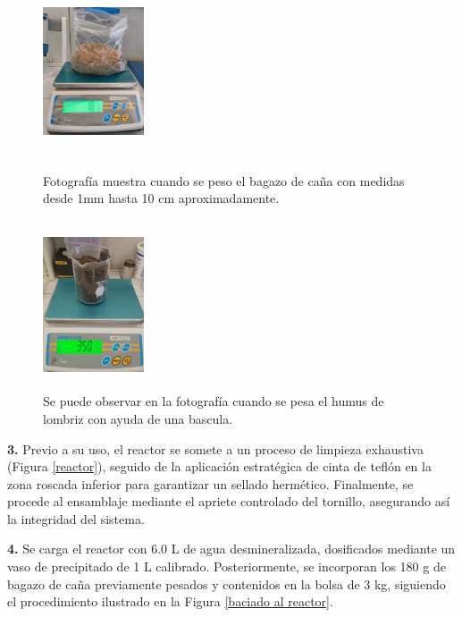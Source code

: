 \documentclass[12pt]{article}
\begin{document}
			
				\begin{figure}[H]
				\centering
				\begin{minipage}{0.46\textwidth}
						\centering
					\includegraphics[width=3cm, height=5cm]{imagenes/pesado2}
					\caption{Fotografía muestra cuando se peso el bagazo de caña con medidas desde 1mm  hasta 10 cm aproximadamente.}
					\label{bagazo_variostamaños}
				\end{minipage}
				\hfill
				\begin{minipage}{0.48\textwidth}
				\centering
				\includegraphics[width=3cm, height=5cm]{imagenes/humus}
				\caption{Se puede observar en la fotografía cuando se pesa el humus de lombriz con ayuda de una bascula.}
				\label{humus}
				\end{minipage}
			\end{figure}
			
			\textbf{3.}	Previo a su uso, el reactor se somete a un proceso de limpieza exhaustiva (Figura \ref{reactor}), seguido de la aplicación estratégica de cinta de teflón en la zona roscada inferior para garantizar un sellado hermético. Finalmente, se procede al ensamblaje mediante el apriete controlado del tornillo, asegurando así la integridad del sistema.
			
			
			
			\textbf{4.}	Se carga el reactor con 6.0 L de agua desmineralizada, dosificados mediante un vaso de precipitado de 1 L calibrado. Posteriormente, se incorporan los 180 g de bagazo de caña previamente pesados y contenidos en la bolsa de 3 kg, siguiendo el procedimiento ilustrado en la Figura \ref{baciado al reactor}.
			
\end{document}
